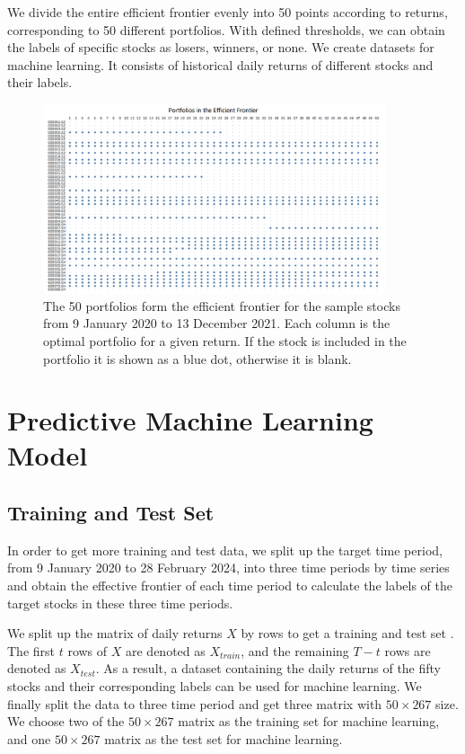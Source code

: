 \documentclass[default,iicol]{sn-jnl}%
\begin{document}
We divide the entire efficient frontier evenly into 50 points according to returns, corresponding to 50 different portfolios. With defined thresholds, we can obtain the labels of specific stocks as losers, winners, or none. We create datasets for machine learning. It consists of historical daily returns of different stocks and their labels.
\begin{figure}[h]
	\centering    
	\includegraphics[width = 0.9\textwidth]{figures/Fig 3.png}
	\caption{The 50 portfolios form the efficient frontier for the sample stocks from 9 January 2020 to 13 December 2021. Each column is the optimal portfolio for a given return. If the stock is included in the portfolio it is shown as a blue dot, otherwise it is blank.}
	\label{fg3}
\end{figure} 

\section{Predictive Machine Learning Model}\label{sec5}
\subsection{Training and Test Set}\label{sec5sub1}
\hspace{1.5em} In order to get more training and test data, we split up the target time period, from 9 January 2020 to 28 February 2024, into three time periods by time series and obtain the effective frontier of each time period to calculate the labels of the target stocks in these three time periods.

We split up the matrix of daily returns $X$ by rows to get a training and test set \cite{buhler2023efficient}. The first $t$ rows of $X$ are denoted as $X_{train}$, and the remaining $T-t$ rows are denoted as $X_{test}$. As a result, a dataset containing the daily returns of the fifty stocks and their corresponding labels can be used for machine learning. We finally split the data to three time period and get three matrix with $50 \times 267$ size. We choose two of the $50 \times 267$ matrix as the training set for machine learning, and one $50 \times 267$ matrix as the test set for machine learning.
\end{document}
